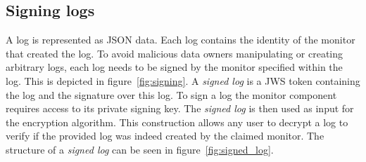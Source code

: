\documentclass[../main.tex]{subfiles}
\begin{document}
\subsection{Signing logs}
\label{sec:signing}
A log is represented as JSON data.
Each log contains the identity of the monitor that created the log.
To avoid malicious data owners manipulating or creating arbitrary logs, each log needs to be signed by the monitor specified within the log.
This is depicted in figure~\ref{fig:signing}.
A \textit{signed log} is a JWS token containing the log and the signature over this log.
To sign a log the monitor component requires access to its private signing key.
The \textit{signed log} is then used as input for the encryption algorithm.
This construction allows any user to decrypt a log to verify if the provided log was indeed created by the claimed monitor.
The structure of a \textit{signed log} can be seen in figure~\ref{fig:signed_log}.
\end{document}
